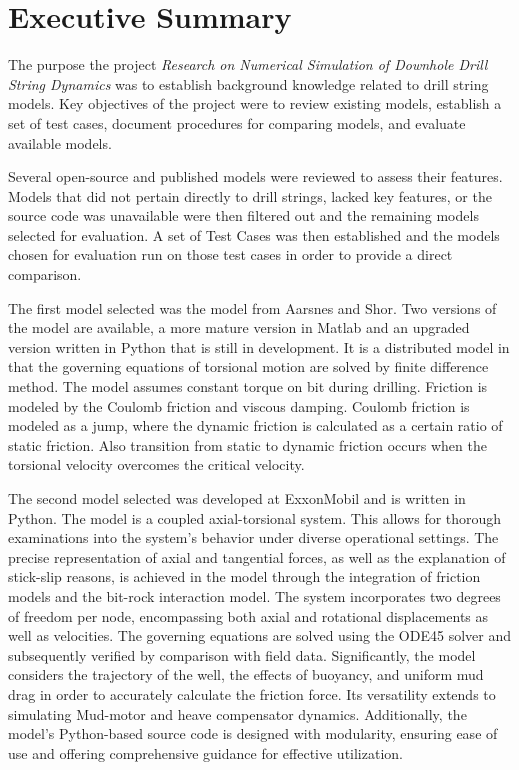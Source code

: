 \chapter*{Executive Summary}

The purpose the project \emph{Research on Numerical Simulation of Downhole Drill String Dynamics} was to establish background knowledge related to drill string models.  Key objectives of the project were to review existing models, establish a set of test cases, document procedures for comparing models, and evaluate available models.

Several open-source and published models were reviewed to assess their features.  Models that did not pertain directly to drill strings, lacked key features, or the source code was unavailable were then filtered out and the remaining models selected for evaluation.  A set of Test Cases was then established and the models chosen for evaluation run on those test cases in order to provide a direct comparison.


The first model selected was the model from Aarsnes and Shor. Two versions of the model are available, a more mature version in Matlab and an upgraded version written in Python that is still in development.  It is a distributed model in that the governing equations of torsional motion are solved by finite difference method. The model assumes constant torque on bit during drilling. Friction is modeled by the Coulomb friction and viscous damping. Coulomb friction is modeled as a jump, where the dynamic friction is calculated as a certain ratio of static friction. Also transition from static to dynamic friction occurs when the torsional velocity overcomes the critical velocity. 

The second model selected was developed at ExxonMobil and is written in Python. The model is a coupled axial-torsional system.  This allows for thorough examinations into the system's behavior under diverse operational settings. The precise representation of axial and tangential forces, as well as the explanation of stick-slip reasons, is achieved in the model through the integration of friction models and the bit-rock interaction model. The system incorporates two degrees of freedom per node, encompassing both axial and rotational displacements as well as velocities. The governing equations are solved using the ODE45 solver and subsequently verified by comparison with field data. Significantly, the model considers the trajectory of the well, the effects of buoyancy, and uniform mud drag in order to accurately calculate the friction force. Its versatility extends to simulating Mud-motor and heave compensator dynamics. Additionally, the model's Python-based source code is designed with modularity, ensuring ease of use and offering comprehensive guidance for effective utilization. 

